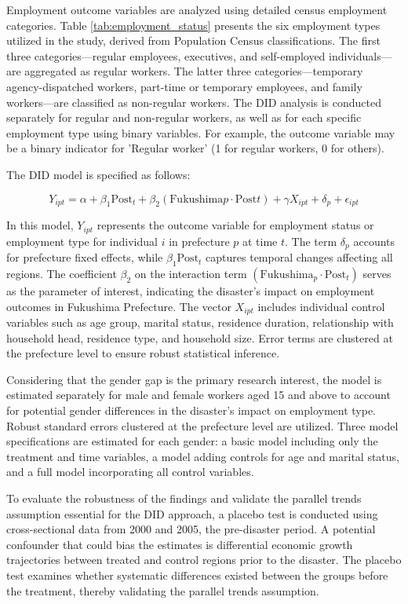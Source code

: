 \documentclass[a4paper,12pt]{article}
\begin{document}
Employment outcome variables are analyzed using detailed census employment categories. Table \ref{tab:employment_status} presents the six employment types utilized in the study, derived from Population Census classifications. The first three categories—regular employees, executives, and self-employed individuals—are aggregated as regular workers. The latter three categories—temporary agency-dispatched workers, part-time or temporary employees, and family workers—are classified as non-regular workers. The DID analysis is conducted separately for regular and non-regular workers, as well as for each specific employment type using binary variables. For example, the outcome variable may be a binary indicator for 'Regular worker' (1 for regular workers, 0 for others).

The DID model is specified as follows:

\begin{equation}
Y_{ipt} = \alpha + \beta_1 \text{Post}_t + \beta_2 (\text{Fukushima}p \cdot \text{Post}t) + \gamma X_{ipt} + \delta_p + \epsilon_{ipt}
\end{equation}

In this model, $Y_{ipt}$ represents the outcome variable for employment status or employment type for individual $i$ in prefecture $p$ at time $t$. The term $\delta_p$ accounts for prefecture fixed effects, while $\beta_1 \text{Post}_t$ captures temporal changes affecting all regions. The coefficient $\beta_2$ on the interaction term $(\text{Fukushima}_p \cdot \text{Post}_t)$ serves as the parameter of interest, indicating the disaster's impact on employment outcomes in Fukushima Prefecture. The vector $X_{ipt}$ includes individual control variables such as age group, marital status, residence duration, relationship with household head, residence type, and household size. Error terms are clustered at the prefecture level to ensure robust statistical inference.

Considering that the gender gap is the primary research interest, the model is estimated separately for male and female workers aged 15 and above to account for potential gender differences in the disaster's impact on employment type. Robust standard errors clustered at the prefecture level are utilized. Three model specifications are estimated for each gender: a basic model including only the treatment and time variables, a model adding controls for age and marital status, and a full model incorporating all control variables.

To evaluate the robustness of the findings and validate the parallel trends assumption essential for the DID approach, a placebo test is conducted using cross-sectional data from 2000 and 2005, the pre-disaster period. A potential confounder that could bias the estimates is differential economic growth trajectories between treated and control regions prior to the disaster. The placebo test examines whether systematic differences existed between the groups before the treatment, thereby validating the parallel trends assumption.
\end{document}
